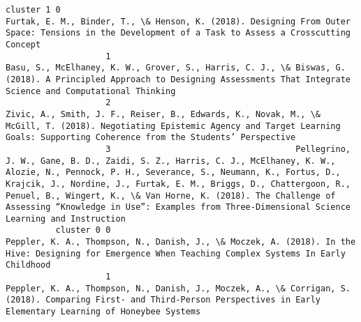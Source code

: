 \documentclass[journal,twocolumn]{IEEEtran}
\begin{document}
\begin{Verbatim}[commandchars=\\\{\}]
          cluster 1 0                                                                                                                                                                                                                                                                            Furtak, E. M., Binder, T., \& Henson, K. (2018). Designing From Outer Space: Tensions in the Development of a Task to Assess a Crosscutting Concept
                    1                                                                                                                                                                                                                                                  Basu, S., McElhaney, K. W., Grover, S., Harris, C. J., \& Biswas, G. (2018). A Principled Approach to Designing Assessments That Integrate Science and Computational Thinking
                    2                                                                                                                                                                                                                                 Zivic, A., Smith, J. F., Reiser, B., Edwards, K., Novak, M., \& McGill, T. (2018). Negotiating Epistemic Agency and Target Learning Goals: Supporting Coherence from the Students’ Perspective
                    3                                     Pellegrino, J. W., Gane, B. D., Zaidi, S. Z., Harris, C. J., McElhaney, K. W., Alozie, N., Pennock, P. H., Severance, S., Neumann, K., Fortus, D., Krajcik, J., Nordine, J., Furtak, E. M., Briggs, D., Chattergoon, R., Penuel, B., Wingert, K., \& Van Horne, K. (2018). The Challenge of Assessing “Knowledge in Use”: Examples from Three-Dimensional Science Learning and Instruction
          cluster 0 0                                                                                                                                                                                                                                                                          Peppler, K. A., Thompson, N., Danish, J., \& Moczek, A. (2018). In the Hive: Designing for Emergence When Teaching Complex Systems In Early Childhood
                    1                                                                                                                                                                                                                                                  Peppler, K. A., Thompson, N., Danish, J., Moczek, A., \& Corrigan, S. (2018). Comparing First- and Third-Person Perspectives in Early Elementary Learning of Honeybee Systems

\end{Verbatim}
\end{document}
